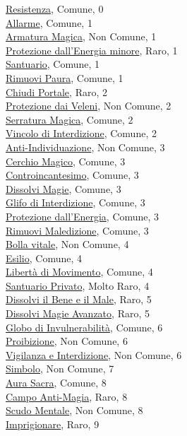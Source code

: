 \begin{multicols}{3}
{{\hyperlink{Resistenza}{Resistenza}, Comune, 0\\
\hyperlink{Allarme}{Allarme}, Comune, 1\\
\hyperlink{Armatura Magica}{Armatura Magica}, Non Comune, 1\\
\hyperlink{Protezione dall'Energia minore}{Protezione dall'Energia minore}, Raro, 1\\
\hyperlink{Santuario}{Santuario}, Comune, 1\\
\hyperlink{Rimuovi Paura}{Rimuovi Paura}, Comune, 1\\
\hyperlink{Chiudi Portale}{Chiudi Portale}, Raro, 2\\
\hyperlink{Protezione dai Veleni}{Protezione dai Veleni}, Non Comune, 2\\
\hyperlink{Serratura Magica}{Serratura Magica}, Comune, 2\\
\hyperlink{Vincolo di Interdizione}{Vincolo di Interdizione}, Comune, 2\\
\hyperlink{Anti-Individuazione}{Anti-Individuazione}, Non Comune, 3\\
\hyperlink{Cerchio Magico}{Cerchio Magico}, Comune, 3\\
\hyperlink{Controincantesimo}{Controincantesimo}, Comune, 3\\
\hyperlink{Dissolvi Magie}{Dissolvi Magie}, Comune, 3\\
\hyperlink{Glifo di Interdizione}{Glifo di Interdizione}, Comune, 3\\
\hyperlink{Protezione dall'Energia}{Protezione dall'Energia}, Comune, 3\\
\hyperlink{Rimuovi Maledizione}{Rimuovi Maledizione}, Comune, 3\\
\hyperlink{Bolla vitale}{Bolla vitale}, Non Comune, 4\\
\hyperlink{Esilio}{Esilio}, Comune, 4\\
\hyperlink{Libertà di Movimento}{Libertà di Movimento}, Comune, 4\\
\hyperlink{Santuario Privato}{Santuario Privato}, Molto Raro, 4\\
\hyperlink{Dissolvi il Bene e il Male}{Dissolvi il Bene e il Male}, Raro, 5\\
\hyperlink{Dissolvi Magie Avanzato}{Dissolvi Magie Avanzato}, Raro, 5\\
\hyperlink{Globo di Invulnerabilità}{Globo di Invulnerabilità}, Comune, 6\\
\hyperlink{Proibizione}{Proibizione}, Non Comune, 6\\
\hyperlink{Vigilanza e Interdizione}{Vigilanza e Interdizione}, Non Comune, 6\\
\hyperlink{Simbolo}{Simbolo}, Non Comune, 7\\
\hyperlink{Aura Sacra}{Aura Sacra}, Comune, 8\\
\hyperlink{Campo Anti-Magia}{Campo Anti-Magia}, Raro, 8\\
\hyperlink{Scudo Mentale}{Scudo Mentale}, Non Comune, 8\\
\hyperlink{Imprigionare}{Imprigionare}, Raro, 9

}}
\end{multicols}
